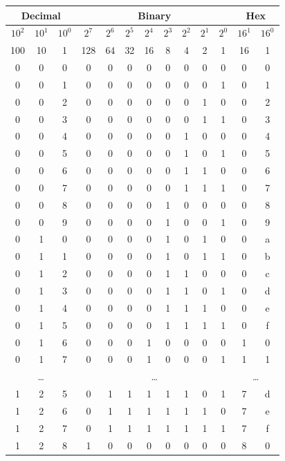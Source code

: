 \begin{figure}[t]
\begin{center}
\begin{tabular}{|c|c|c||c|c|c|c|c|c|c|c||c|c|}
\hline
\multicolumn{3}{|c||}{Decimal} & \multicolumn{8}{|c||}{Binary} & \multicolumn{2}{|c|}{Hex}\\
\hline
$10^2$	& $10^1$	& $10^0$	& $2^7$ & $2^6$ & $2^5$ & $2^4$ & $2^3$ & $2^2$ & $2^1$ & $2^0$		& $16^1$ & $16^0$	\\
\hline
100		&	10		& 1			& 128	& 64	& 32	& 16	& 8		& 4		& 2		& 1			& 16	& 1			\\
\hline \hline
0		&	0		&	0		& 0 & 0 & 0 & 0 & 0 & 0 & 0 & 0		& 0 & 0 \\
0		&	0		&	1		& 0 & 0 & 0 & 0 & 0 & 0 & 0 & 1		& 0 & 1 \\
0		&	0		&	2		& 0 & 0 & 0 & 0 & 0 & 0 & 1 & 0		& 0 & 2 \\
0		&	0		&	3		& 0 & 0 & 0 & 0 & 0 & 0 & 1 & 1		& 0 & 3 \\
0		&	0		&	4		& 0 & 0 & 0 & 0 & 0 & 1 & 0 & 0		& 0 & 4 \\
0		&	0		&	5		& 0 & 0 & 0 & 0 & 0 & 1 & 0 & 1		& 0 & 5 \\
0		&	0		&	6		& 0 & 0 & 0 & 0 & 0 & 1 & 1 & 0		& 0 & 6 \\
0		&	0		&	7		& 0 & 0 & 0 & 0 & 0 & 1 & 1 & 1		& 0 & 7 \\
0		&	0		&	8		& 0 & 0 & 0 & 0 & 1 & 0 & 0 & 0		& 0 & 8 \\
0		&	0		&	9		& 0 & 0 & 0 & 0 & 1 & 0 & 0 & 1		& 0 & 9 \\
0		&	1		&	0		& 0 & 0 & 0 & 0 & 1 & 0 & 1 & 0		& 0 & a \\
0		&	1		&	1		& 0 & 0 & 0 & 0 & 1 & 0 & 1 & 1		& 0 & b \\
0		&	1		&	2		& 0 & 0 & 0 & 0 & 1 & 1 & 0 & 0		& 0 & c \\
0		&	1		&	3		& 0 & 0 & 0 & 0 & 1 & 1 & 0 & 1		& 0 & d \\
0		&	1		&	4		& 0 & 0 & 0 & 0 & 1 & 1 & 1 & 0		& 0 & e \\
0		&	1		&	5		& 0 & 0 & 0 & 0 & 1 & 1 & 1 & 1		& 0 & f \\
0		&	1		&	6		& 0 & 0 & 0 & 1 & 0 & 0 & 0 & 0		& 1 & 0 \\
0		&	1		&	7		& 0 & 0 & 0 & 1 & 0 & 0 & 0 & 1		& 1 & 1 \\
\hline
\multicolumn{3}{|c||}{\ldots} & \multicolumn{8}{|c||}{\ldots} & \multicolumn{2}{|c|}{\ldots}\\
\hline
1       &   2       &   5		& 0 & 1 & 1 & 1 & 1 & 1 & 0 & 1		& 7 & d \\
1       &   2       &   6		& 0 & 1 & 1 & 1 & 1 & 1 & 1 & 0		& 7 & e \\
1       &   2       &   7		& 0 & 1 & 1 & 1 & 1 & 1 & 1 & 1		& 7 & f \\
1       &   2       &   8		& 1 & 0 & 0 & 0 & 0 & 0 & 0 & 0		& 8 & 0 \\
\hline
\end{tabular}
\end{center}
\label{Figure:integers}
\end{figure}

